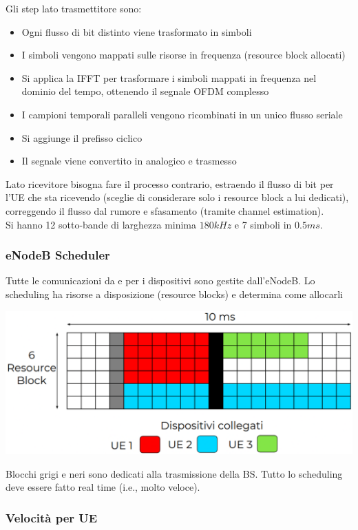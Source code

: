 Gli step lato trasmettitore sono: 
\begin{itemize}
	\item Ogni flusso di bit distinto viene trasformato in simboli
	\item I simboli vengono mappati sulle risorse in frequenza (resource block allocati)
	\item Si applica la IFFT per trasformare i simboli mappati in frequenza nel dominio del tempo, ottenendo il segnale OFDM complesso
	\item I campioni temporali paralleli vengono ricombinati in un unico flusso seriale
	\item Si aggiunge il prefisso ciclico
	\item Il segnale viene convertito in analogico e trasmesso
\end{itemize}
Lato ricevitore bisogna fare il processo contrario, estraendo il flusso di bit per l'UE che sta ricevendo (sceglie di considerare solo i resource block a lui dedicati), correggendo il flusso dal rumore e sfasamento (tramite channel estimation).\\

Si hanno 12 sotto-bande di larghezza minima $180 kHz$ e 7 simboli in $0.5ms$. \\

\subsubsection{eNodeB Scheduler}
Tutte le comunicazioni da e per i dispositivi sono gestite dall'eNodeB. Lo scheduling ha risorse a disposizione (resource blocks) e determina come allocarli
\begin{center}
	\includegraphics[width=0.75\linewidth]{img/4g/alloc}
\end{center}
Blocchi grigi e neri sono dedicati alla trasmissione della BS. Tutto lo scheduling deve essere fatto real time (i.e., molto veloce).\\

\subsubsection{Velocità per UE}

